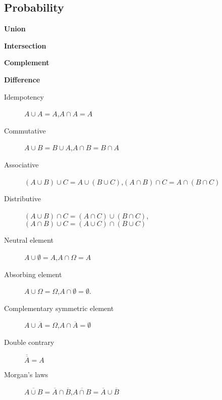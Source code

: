 \begin{multicols*}{2}
\newpage

\subsection*{Probability}

\begin{tcolorbox}[hbox, title=Event operations]
\begin{minipage}{0.4\textwidth}
\textbf{Union}
\begin{center}

\end{center}
\textbf{Intersection}
\begin{center}

\end{center}
\textbf{Complement}
\begin{center}

\end{center}
\textbf{Difference}
\begin{center}

\end{center}
\end{minipage}
\end{tcolorbox}

\begin{tcolorbox}[hbox, title=Algebra of events]
\begin{minipage}{0.4\textwidth}
\begin{description}
\item[Idempotency] $A\cup A=A$,\quad $A\cap A=A$
\item[Commutative] $A\cup B=B\cup A$,\quad $A\cap B = B\cap A$
\item[Associative] $(A\cup B)\cup C = A\cup (B\cup C)$,\quad $(A\cap B)\cap C = A\cap (B\cap C)$
\item[Distributive] $(A\cup B)\cap C = (A\cap C)\cup (B\cap C)$,\quad $(A\cap B)\cup C = (A\cup C)\cap (B\cup C)$
\item[Neutral element] $A\cup \emptyset=A$,\quad $A\cap \Omega=A$
\item[Absorbing element] $A\cup \Omega=\Omega$,\quad $A\cap \emptyset=\emptyset$.
\item[Complementary symmetric element] $A\cup \overline A = \Omega$,\quad $A\cap \overline A= \emptyset$
\item[Double contrary] $\overline{\overline A} = A$
\item[Morgan's laws] $\overline{A\cup B} = \overline A\cap \overline B$,\quad $\overline{A\cap B} = \overline A\cup \overline B$
\end{description}
\end{minipage}
\end{tcolorbox}


\end{multicols*}
